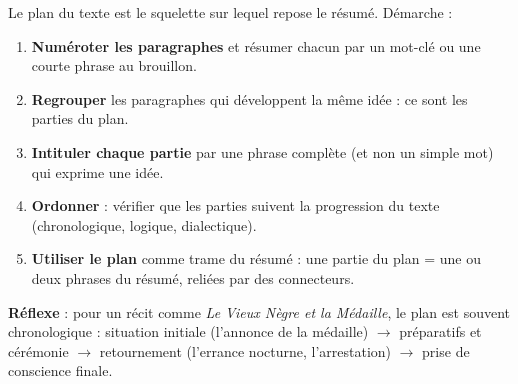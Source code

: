 \documentclass[11pt]{article}
\newcommand{\cle}[1]{{\popxbold\color{popdark}#1}}
\begin{document}
\begin{methode}
Le \cle{plan du texte} est le squelette sur lequel repose le résumé. Démarche :
\begin{enumerate}
\item \textbf{Numéroter les paragraphes} et résumer chacun par un mot-clé ou une courte phrase au brouillon.
\item \textbf{Regrouper} les paragraphes qui développent la même idée : ce sont les parties du plan.
\item \textbf{Intituler chaque partie} par une phrase complète (et non un simple mot) qui exprime une idée.
\item \textbf{Ordonner} : vérifier que les parties suivent la progression du texte (chronologique, logique, dialectique).
\item \textbf{Utiliser le plan} comme trame du résumé : une partie du plan = une ou deux phrases du résumé, reliées par des connecteurs.
\end{enumerate}
\textbf{Réflexe} : pour un récit comme \emph{Le Vieux Nègre et la Médaille}, le plan est souvent chronologique : situation initiale (l'annonce de la médaille) $\rightarrow$ préparatifs et cérémonie $\rightarrow$ retournement (l'errance nocturne, l'arrestation) $\rightarrow$ prise de conscience finale.
\end{methode}
\end{document}
